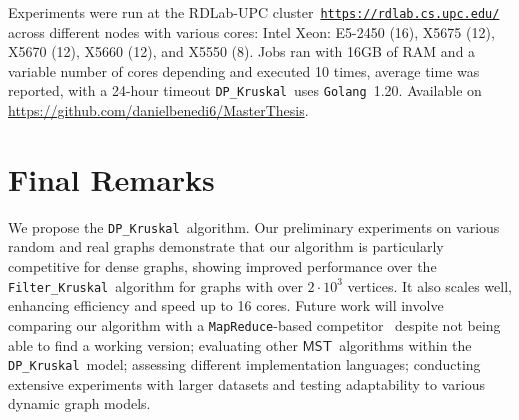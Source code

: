 \documentclass[runningheads,UKenglish]{llncs}
\newcommand{\mst}{$\mathsf{MST}$}
\newcommand{\DPmst}{\texttt{DP\_{Kruskal}}}
\newcommand{\FKruskal}{\texttt{Filter\_{Kruskal}}}
\newcommand{\Go}{{\tt Go}}
\newcommand{\Golang}{{\tt Golang}}
\begin{document}
\noindent
Experiments were run at the RDLab-UPC cluster~\href{https://rdlab.cs.upc.edu/}{\texttt{https://rdlab.cs.upc.edu/}}
across different nodes with various cores: Intel Xeon: E5-2450 (16),
X5675 (12), X5670 (12), X5660 (12),
and X5550 (8). Jobs ran with 16GB of RAM and a variable
number of cores depending and executed 10 times, average
time was reported, with a 24-hour timeout \DPmst\ uses \Golang\ 1.20. Available on \href{https://github.com/danielbenedi6/MasterThesis}{https://github.com/danielbenedi6/MasterThesis}.
%
\vspace{-1em}

\section{Final Remarks}
\label{sec:ongoing}
We propose the \DPmst\ algorithm. Our preliminary experiments on various random and real graphs demonstrate that our algorithm is particularly competitive for dense graphs, showing improved performance over the \FKruskal\ algorithm for graphs with over $2 \cdot 10^3$ vertices. It also scales well, enhancing efficiency and speed up to 16 cores. 
%
Future work will involve comparing our algorithm with a {\tt MapReduce}-based competitor~\cite{nowicki2021dynamic} despite not being able to find a working version; evaluating other \mst\ algorithms within the \DPmst\ model; assessing different implementation languages; conducting extensive experiments with larger datasets and testing adaptability to various dynamic graph models.

%
%
%


%
\end{document}
